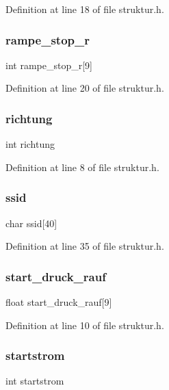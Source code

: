 Definition at line 18 of file struktur.\+h.

\mbox{\label{structramp1_a3079348a59422c0114861661b76b18dd}} 
\subsubsection{rampe\+\_\+stop\+\_\+r}
{\footnotesize\ttfamily int rampe\+\_\+stop\+\_\+r[9]}



Definition at line 20 of file struktur.\+h.

\mbox{\label{structramp1_a5e72b5253e770beca9151717a3385997}} 
\subsubsection{richtung}
{\footnotesize\ttfamily int richtung}



Definition at line 8 of file struktur.\+h.

\mbox{\label{structramp1_a1b7c20394d0e2d577f6f90615236e597}} 
\subsubsection{ssid}
{\footnotesize\ttfamily char ssid[40]}



Definition at line 35 of file struktur.\+h.

\mbox{\label{structramp1_ad85bba15765feeacd3e8aae477ccab8d}} 
\subsubsection{start\+\_\+druck\+\_\+rauf}
{\footnotesize\ttfamily float start\+\_\+druck\+\_\+rauf[9]}



Definition at line 10 of file struktur.\+h.

\mbox{\label{structramp1_a8815ce62e9bfa63cd2a24d017779ed51}} 
\subsubsection{startstrom}
{\footnotesize\ttfamily int startstrom}



